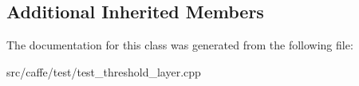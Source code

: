 \subsection*{Additional Inherited Members}


The documentation for this class was generated from the following file\+:\begin{DoxyCompactItemize}
\item 
src/caffe/test/test\+\_\+threshold\+\_\+layer.\+cpp\end{DoxyCompactItemize}
